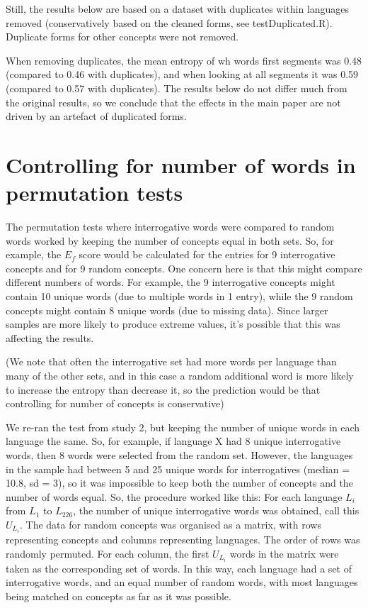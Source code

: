 \documentclass[10pt,a4paper,landscape]{article}
\begin{document}
Still, the results below are based on a dataset with duplicates within languages removed (conservatively based on the cleaned forms, see testDuplicated.R).  Duplicate forms for other concepts were not removed.  

When removing duplicates, the mean entropy of wh words first segments was 0.48 (compared to 0.46 with duplicates), and when looking at all segments it was 0.59 (compared to 0.57 with duplicates).  The results below do not differ much from the original results, so we conclude that the effects in the main paper are not driven by an artefact of duplicated forms. 



\clearpage
\newpage

\section{Controlling for number of words in permutation tests}

The permutation tests where interrogative words were compared to random words worked by keeping the number of concepts equal in both sets.  So, for example, the $E_f$ score would be calculated for the entries for 9 interrogative concepts and for 9 random concepts.  One concern here is that this might compare different numbers of words.  For example, the 9 interrogative concepts might contain 10 unique words (due to multiple words in 1 entry), while the 9 random concepts might contain 8 unique words (due to missing data).  Since larger samples are more likely to produce extreme values, it's possible that this was affecting the results.

(We note that often the interrogative set had more words per language than many of the other sets, and in this case a random additional word is more likely to increase the entropy than decrease it, so the prediction would be that controlling for number of concepts is conservative)

We re-ran the test from study 2, but keeping the number of unique words in each language the same.  So, for example, if language X had 8 unique interrogative words, then 8 words were selected from the random set.  However, the languages in the sample had between 5 and 25 unique words for interrogatives (median = 10.8, sd = 3), so it was impossible to keep both the number of concepts and the number of words equal.  So, the procedure worked like this:  For each language $L_i$ from $L_1$ to $L_{226}$, the number of unique interrogative words was obtained, call this $U_{L_i}$.  The data for random concepts was organised as a matrix, with rows representing concepts and columns representing languages.  The order of rows was randomly permuted.  For each column, the first $U_{L_i}$ words in the matrix were taken as the corresponding set of words.  In this way, each language had a set of interrogative words, and an equal number of random words, with most languages being matched on concepts as far as it was possible.
\end{document}
